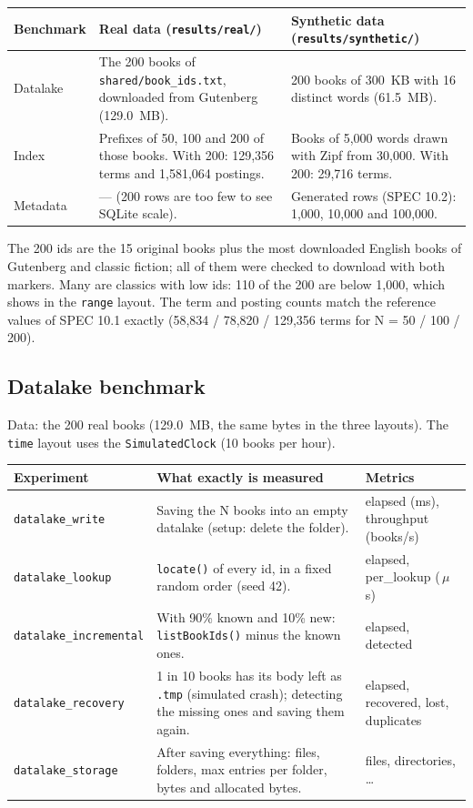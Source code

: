 \documentclass[11pt,a4paper]{article}
\newcommand{\code}[1]{\texttt{#1}}
\newcommand{\us}{\,$\mu$s}
\begin{document}
\begin{table}[H]
\centering\small
\begin{tabularx}{\linewidth}{@{}l Y Y@{}}
\toprule
Benchmark & Real data (\code{results/real/}) & Synthetic data (\code{results/synthetic/}) \\
\midrule
Datalake & The 200 books of \code{shared/book\_ids.txt}, downloaded from Gutenberg (129.0~MB). & 200 books of 300~KB with 16 distinct words (61.5~MB). \\
Index & Prefixes of 50, 100 and 200 of those books. With 200: 129,356 terms and 1,581,064 postings. & Books of 5,000 words drawn with Zipf from 30,000. With 200: 29,716 terms. \\
Metadata & --- (200 rows are too few to see SQLite scale). & Generated rows (SPEC 10.2): 1,000, 10,000 and 100,000. \\
\bottomrule
\end{tabularx}
\end{table}

The 200 ids are the 15 original books plus the most downloaded English books of Gutenberg and
classic fiction; all of them were checked to download with both markers. Many are classics with low
ids: 110 of the 200 are below 1,000, which shows in the \code{range} layout. The term and posting
counts match the reference values of SPEC 10.1 exactly (58,834 / 78,820 / 129,356 terms for
N = 50 / 100 / 200).

\subsection{Datalake benchmark}
Data: the 200 real books (129.0~MB, the same bytes in the three layouts). The \code{time} layout
uses the \code{SimulatedClock} (10 books per hour).

\begin{table}[H]
\centering\small
\begin{tabularx}{\linewidth}{@{}l Y l@{}}
\toprule
Experiment & What exactly is measured & Metrics \\
\midrule
\code{datalake\_write} & Saving the N books into an empty datalake (setup: delete the folder). & elapsed (ms), throughput (books/s) \\
\code{datalake\_lookup} & \code{locate()} of every id, in a fixed random order (seed 42). & elapsed, per\_lookup (\us) \\
\code{datalake\_incremental} & With 90\% known and 10\% new: \code{listBookIds()} minus the known ones. & elapsed, detected \\
\code{datalake\_recovery} & 1 in 10 books has its body left as \code{.tmp} (simulated crash); detecting the missing ones and saving them again. & elapsed, recovered, lost, duplicates \\
\code{datalake\_storage} & After saving everything: files, folders, max entries per folder, bytes and allocated bytes. & files, directories, \ldots \\
\bottomrule
\end{tabularx}
\end{table}
\end{document}
